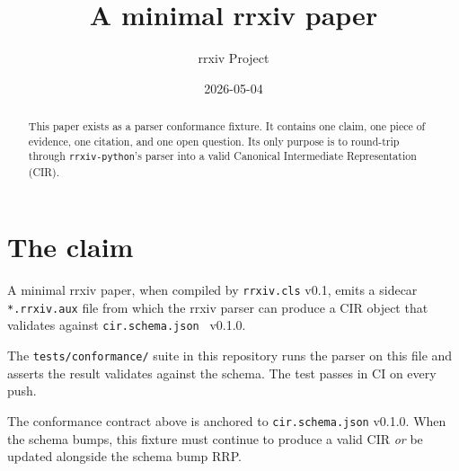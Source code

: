 \documentclass{rrxiv}
\title{A minimal rrxiv paper}
\author{rrxiv Project}
\date{2026-05-04}
\begin{document}
\maketitle

\begin{abstract}
This paper exists as a parser conformance fixture. It contains one claim,
one piece of evidence, one citation, and one open question. Its only
purpose is to round-trip through \texttt{rrxiv-python}'s parser into a
valid Canonical Intermediate Representation (CIR).
\end{abstract}

\section{The claim}
\label{sec:claim}

\begin{claim}
\label{claim:fixture}
A minimal rrxiv paper, when compiled by \texttt{rrxiv.cls} v0.1, emits a
sidecar \texttt{*.rrxiv.aux} file from which the rrxiv parser can produce
a CIR object that validates against \texttt{cir.schema.json}~\cite{rrxiv-cir-schema} v0.1.0.
\end{claim}

\begin{evidence}
\label{ev:ci-test}
The \texttt{tests/conformance/} suite in this repository runs the parser
on this file and asserts the result validates against the schema.
The test passes in CI on every push.
\end{evidence}

\begin{openquestion}
\label{oq:schema-bumps}
The conformance contract above is anchored to \texttt{cir.schema.json}
v0.1.0. When the schema bumps, this fixture must continue to produce a
valid CIR \emph{or} be updated alongside the schema bump RRP.
\end{openquestion}



\end{document}
